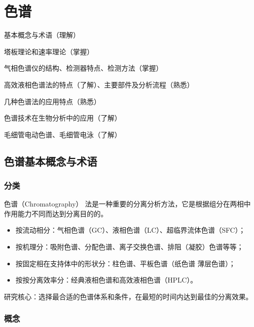 \chapter{色谱}

\begin{introduction}
	\item 基本概念与术语（理解）
	\item 塔板理论和速率理论（掌握）
	\item 气相色谱仪的结构、检测器特点、检测方法（掌握）
	\item 高效液相色谱法的特点（了解）、主要部件及分析流程（熟悉）
	\item 几种色谱法的应用特点（熟悉）
	\item 色谱技术在生物分析中的应用（了解）
	\item 毛细管电动色谱、毛细管电泳（了解）
\end{introduction}





\section{色谱基本概念与术语}

\subsection{分类}
色谱（Chromatography） 法是一种重要的分离分析方法，它是根据组分在两相中作用能力不同而达到分离目的的。
\begin{itemize}
	\item 按流动相分：气相色谱（GC）、液相色谱（LC）、超临界流体色谱（SFC）；
	\item 按机理分：吸附色谱、分配色谱、离子交换色谱、排阻（凝胶）色谱等等；
	\item 按固定相在支持体中的形状分：柱色谱、平板色谱（纸色谱 薄层色谱）；
	\item 按按分离效率分：经典液相色谱和高效液相色谱（HPLC）。
\end{itemize}

研究核心：选择最合适的色谱体系和条件，在最短的时间内达到最佳的分离效果。

\subsection{概念}

